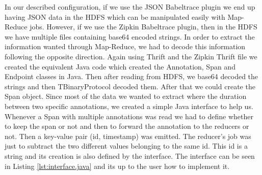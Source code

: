 In our described configuration, if we use the JSON Babeltrace plugin we end up
having JSON data in the HDFS which can be manipulated easily with Map-Reduce
jobs. However, if we use the Zipkin Babeltrace plugin, then in the HDFS we have
multiple files containing base64 encoded strings. In order to extract the
information wanted through Map-Reduce, we had to decode this information
following the opposite direction. Again using Thrift and the Zipkin Thrift
file we created the equivalent Java code which created the Annotation, Span and
Endpoint classes in Java. Then after reading from HDFS, we base64 decoded the
strings and then TBinaryProtocol decoded them. After that we could create the
Span object. Since most of the data we wanted to extract where the duration
between two specific annotations, we created a simple Java interface to help us.
Whenever a Span with multiple annotations was read we had to define whether to
keep the span or not and then to forward the annotation to the reducers or not.
Then a key-value pair (id, timestamp) was emitted. The reducer's job was just to
subtract the two different values belonging to the same id. This id is a string
and its creation is also defined by the interface. The interface can be seen in
Listing \ref{lst:interface.java} and its up to the user how to implement it.

